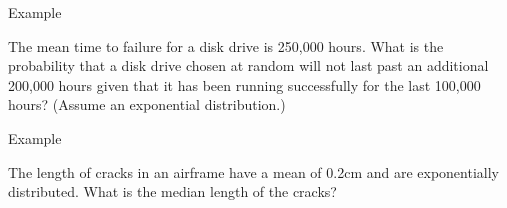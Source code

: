 \begin{frame}{Example}

  The mean time to failure for a disk drive is 250,000 hours. What is
  the probability that a disk drive chosen at random will not last
  past an additional 200,000 hours given that it has been running
  successfully for the last 100,000 hours? (Assume an exponential
  distribution.)
  
\end{frame}

\begin{frame}{Example}

  The length of cracks in an airframe have a mean of 0.2cm and are
  exponentially distributed. What is the median length of the cracks?
  
\end{frame}


